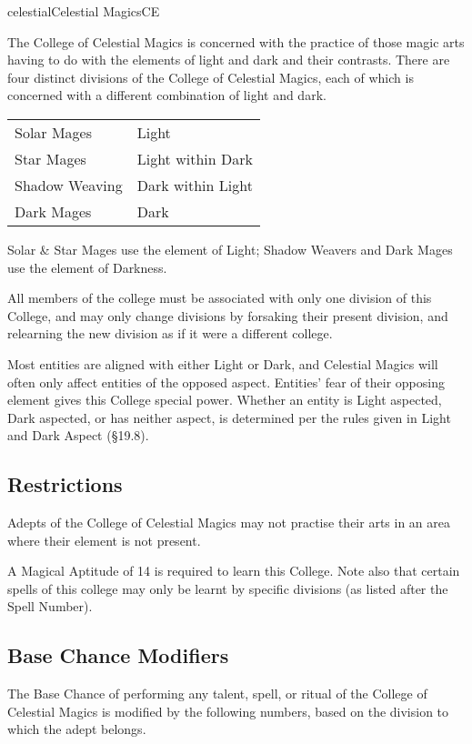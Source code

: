 \begin{College}[1.3]{celestial}{Celestial Magics}{CE}

The College of Celestial Magics is concerned with the practice of
those magic arts having to do with the elements of light and dark and
their contrasts.  There are four distinct divisions of the College of
Celestial Magics, each of which is concerned with a different
combination of light and dark.

\begin{tabular}{ll}
Solar Mages	& Light \\
Star Mages	& Light within Dark \\
Shadow Weaving	& Dark within Light \\
Dark Mages	& Dark  \\
\end{tabular}

Solar \& Star Mages use the element of Light; Shadow Weavers and Dark
Mages use the element of Darkness.

All members of the college must be associated with only one division
of this College, and may only change divisions by forsaking their
present division, and relearning the new division as if it were a
different college.

Most entities are aligned with either Light or Dark, and Celestial
Magics will often only affect entities of the opposed aspect.
Entities’ fear of their opposing element gives this College special
power.  Whether an entity is Light aspected, Dark aspected, or has
neither aspect, is determined per the rules given in Light and Dark
Aspect (§19.8).

\subsection{Restrictions}

Adepts of the College of Celestial Magics may not practise their arts
in an area where their element is not present.

A Magical Aptitude of 14 is required to learn this College. Note also
that certain spells of this college may only be learnt by specific
divisions (as listed after the Spell Number).

\subsection{Base Chance Modifiers}

The Base Chance of performing any talent, spell, or ritual of the
College of Celestial Magics is modified by the following numbers,
based on the division to which the adept belongs.


\end{College}
